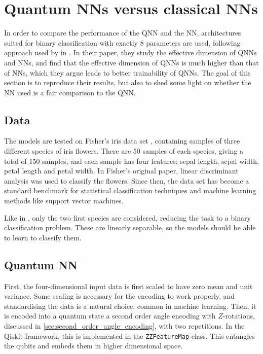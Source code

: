 \section{Quantum NNs versus classical NNs}
\label{sec:qnn-vs-nn}

In order to compare the performance of the QNN and the NN, architectures suited for binary classification with exactly 8 parameters are used, following approach used by \textcite{abbas2021} in .
In their paper, they study the effective dimension of QNNs and NNs, and find that the effective dimension of QNNs is much higher than that of NNs, which they argue leads to better trainability of QNNs.
The goal of this section is to reproduce their results, but also to shed some light on whether the NN used is a fair comparison to the QNN.

\subsection{Data}
The models are tested on Fisher's iris data set \cite{fisher1936}, containing samples of three different species of iris flowers.
There are 50 samples of each species, giving a total of 150 samples, and each sample has four features: sepal length, sepal width, petal length and petal width.
In Fisher's original paper, linear discriminant analysis was used to classify the flowers.
Since then, the data set has become a standard benchmark for statistical classification techniques and machine learning methods like support vector machines.

Like in \cite{abbas2021}, only the two first species are considered, reducing the task to a binary classification problem.
These are linearly separable, so the models should be able to learn to classify them.


\subsection{Quantum NN}
First, the four-dimensional input data is first scaled to have zero mean and unit variance.
Some scaling is necessary for the encoding to work properly, and standardising the data is a natural choice, common in machine learning.
Then, it is encoded into a quantum state a second order angle encoding with $Z$-rotations, discussed in \cref{sec:second_order_angle_encoding}, with two repetitions.
In the Qiskit framework, this is implemented in the \texttt{ZZFeatureMap} class.
This entangles the qubits and embeds them in higher dimensional space.

